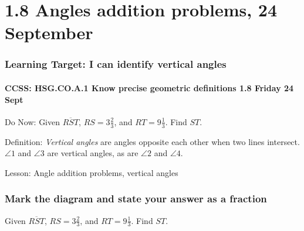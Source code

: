 \documentclass{beamer}
\begin{document}
  \section{1.8 Angles addition problems, 24 September}
  \frame
  {
    \frametitle{Learning Target: I can identify vertical angles}
    \framesubtitle{CCSS: HSG.CO.A.1 Know precise geometric definitions  \hfill \alert{1.8 Friday 24 Sept}}
  
    \begin{block}{Do Now: Given $\overline{RST}$, $RS=3 \frac{2}{3}$, and $RT=9 \frac{1}{3}$. Find ${ST}$.}\vspace{0.5cm}
    \end{block} \vspace{0.5cm}
    Definition: \emph{Vertical angles} are angles opposite each other when two lines intersect. $\angle 1$ and $\angle 3$ are vertical angles, as are $\angle 2$ and $\angle 4$.
  \begin{center}
  \end{center}
    Lesson: Angle addition problems, vertical angles
  }
  
  \frame
  {
    \frametitle{Mark the diagram and state your answer as a fraction}
      Given $\overline{RST}$, $RS=3 \frac{2}{3}$, and $RT=9 \frac{1}{3}$. Find ${ST}$.\\[0.75cm]
         \vspace{5cm} 
  }
\end{document}
